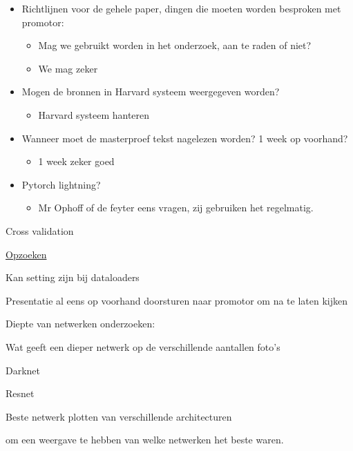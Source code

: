 \documentclass{scrartcl}
\begin{document}
	\begin{itemize}
	\item Richtlijnen voor de gehele paper, dingen die moeten worden besproken met promotor:
		\begin{itemize}
		\item Mag we gebruikt worden in het onderzoek, aan te raden of niet?
		\item We mag zeker
		\end{itemize}
	\item Mogen de bronnen in Harvard systeem weergegeven worden?
		\begin{itemize}
		\item Harvard systeem hanteren
		\end{itemize}
	\item Wanneer moet de masterproef tekst nagelezen worden? 1 week op voorhand?
		\begin{itemize}
		\item 1 week zeker goed
		\end{itemize}
	\item Pytorch lightning?
		\begin{itemize}
		\item Mr Ophoff of de feyter eens vragen, zij gebruiken het regelmatig.
		\end{itemize}
	\end{itemize}


Cross validation

	\uline{Opzoeken} 
	
	Kan setting zijn bij dataloaders
	
	



Presentatie al eens op voorhand doorsturen naar promotor om na te laten kijken



Diepte van netwerken onderzoeken:

	Wat geeft een dieper netwerk op de verschillende aantallen foto's
	
	Darknet
	
	Resnet 
	


Beste netwerk plotten van verschillende architecturen

	om een weergave te hebben van welke netwerken het beste waren. 
	
	
\end{document}
